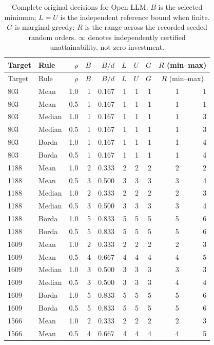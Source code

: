 \begin{longtable}{llrrr rr r rr}
\caption{Complete original decisions for Open LLM. $B$ is the selected minimum; $L=U$ is the independent reference bound when finite. $G$ is marginal greedy; $R$ is the range across the recorded seeded random orders. $\infty$ denotes independently certified unattainability, not zero investment.}\\
\toprule
Target & Rule & $\rho$ & $B$ & $B/d$ & $L$ & $U$ & $G$ & \multicolumn{2}{c}{$R$ (min--max)} \\
\midrule\endfirsthead
\toprule Target & Rule & $\rho$ & $B$ & $B/d$ & $L$ & $U$ & $G$ & \multicolumn{2}{c}{$R$ (min--max)} \\ \midrule\endhead
803 & Mean & 1.0 & 1 & 0.167 & 1 & 1 & 1 & 1 & 1 \\
803 & Mean & 0.5 & 1 & 0.167 & 1 & 1 & 1 & 1 & 1 \\
803 & Median & 1.0 & 1 & 0.167 & 1 & 1 & 1 & 1 & 3 \\
803 & Median & 0.5 & 1 & 0.167 & 1 & 1 & 1 & 1 & 3 \\
803 & Borda & 1.0 & 1 & 0.167 & 1 & 1 & 1 & 1 & 4 \\
803 & Borda & 0.5 & 1 & 0.167 & 1 & 1 & 1 & 1 & 4 \\
1188 & Mean & 1.0 & 2 & 0.333 & 2 & 2 & 2 & 2 & 2 \\
1188 & Mean & 0.5 & 3 & 0.500 & 3 & 3 & 3 & 3 & 4 \\
1188 & Median & 1.0 & 2 & 0.333 & 2 & 2 & 2 & 2 & 3 \\
1188 & Median & 0.5 & 3 & 0.500 & 3 & 3 & 3 & 3 & 4 \\
1188 & Borda & 1.0 & 5 & 0.833 & 5 & 5 & 5 & 5 & 6 \\
1188 & Borda & 0.5 & 5 & 0.833 & 5 & 5 & 5 & 5 & 6 \\
1609 & Mean & 1.0 & 2 & 0.333 & 2 & 2 & 2 & 2 & 3 \\
1609 & Mean & 0.5 & 4 & 0.667 & 4 & 4 & 4 & 4 & 5 \\
1609 & Median & 1.0 & 3 & 0.500 & 3 & 3 & 3 & 3 & 3 \\
1609 & Median & 0.5 & 3 & 0.500 & 3 & 3 & 3 & 4 & 4 \\
1609 & Borda & 1.0 & 5 & 0.833 & 5 & 5 & 5 & 5 & 6 \\
1609 & Borda & 0.5 & 5 & 0.833 & 5 & 5 & 5 & 5 & 6 \\
1566 & Mean & 1.0 & 2 & 0.333 & 2 & 2 & 2 & 2 & 3 \\
1566 & Mean & 0.5 & 4 & 0.667 & 4 & 4 & 4 & 4 & 5 \\

\end{longtable}
